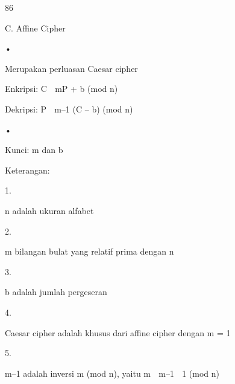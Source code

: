 \documentclass{article}
\begin{document}

86

C. Affine Cipher

•

Merupakan perluasan Caesar cipher


Enkripsi: C  mP + b (mod n) 


Dekripsi: P   m–1 (C – b) (mod n)

•

Kunci: m dan b  

Keterangan:

1.

n adalah ukuran alfabet 

2.

m bilangan bulat yang relatif prima dengan n 

3.

b adalah jumlah pergeseran 

4.

Caesar cipher adalah khusus dari affine cipher dengan  m = 1 

5.

m–1 adalah inversi m (mod n), yaitu m  m–1  1 (mod n)
\end{document}
